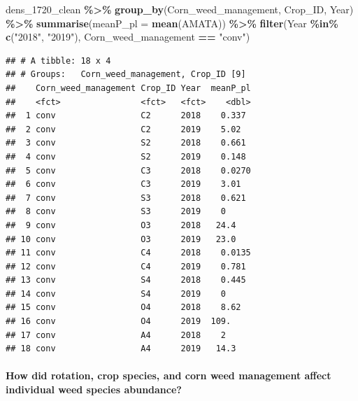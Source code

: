 \documentclass[
]{article}
\author{}
\date{\vspace{-2.5em}}
\newenvironment{Shaded}{\begin{snugshade}}{\end{snugshade}}
\newcommand{\AttributeTok}[1]{\textcolor[rgb]{0.13,0.29,0.53}{#1}}
\newcommand{\FunctionTok}[1]{\textcolor[rgb]{0.13,0.29,0.53}{\textbf{#1}}}
\newcommand{\NormalTok}[1]{#1}
\newcommand{\SpecialCharTok}[1]{\textcolor[rgb]{0.81,0.36,0.00}{\textbf{#1}}}
\newcommand{\StringTok}[1]{\textcolor[rgb]{0.31,0.60,0.02}{#1}}
\begin{document}
\begin{Shaded}
\begin{Highlighting}[]
\NormalTok{dens\_1720\_clean }\SpecialCharTok{\%\textgreater{}\%}
  \FunctionTok{group\_by}\NormalTok{(Corn\_weed\_management, Crop\_ID, Year) }\SpecialCharTok{\%\textgreater{}\%}
  \FunctionTok{summarise}\NormalTok{(}\AttributeTok{meanP\_pl =} \FunctionTok{mean}\NormalTok{(AMATA)) }\SpecialCharTok{\%\textgreater{}\%}
  \FunctionTok{filter}\NormalTok{(Year }\SpecialCharTok{\%in\%} \FunctionTok{c}\NormalTok{(}\StringTok{"2018"}\NormalTok{, }\StringTok{"2019"}\NormalTok{), Corn\_weed\_management }\SpecialCharTok{==} \StringTok{"conv"}\NormalTok{)}
\end{Highlighting}
\end{Shaded}

\begin{verbatim}
## # A tibble: 18 x 4
## # Groups:   Corn_weed_management, Crop_ID [9]
##    Corn_weed_management Crop_ID Year  meanP_pl
##    <fct>                <fct>   <fct>    <dbl>
##  1 conv                 C2      2018    0.337 
##  2 conv                 C2      2019    5.02  
##  3 conv                 S2      2018    0.661 
##  4 conv                 S2      2019    0.148 
##  5 conv                 C3      2018    0.0270
##  6 conv                 C3      2019    3.01  
##  7 conv                 S3      2018    0.621 
##  8 conv                 S3      2019    0     
##  9 conv                 O3      2018   24.4   
## 10 conv                 O3      2019   23.0   
## 11 conv                 C4      2018    0.0135
## 12 conv                 C4      2019    0.781 
## 13 conv                 S4      2018    0.445 
## 14 conv                 S4      2019    0     
## 15 conv                 O4      2018    8.62  
## 16 conv                 O4      2019  109.    
## 17 conv                 A4      2018    2     
## 18 conv                 A4      2019   14.3
\end{verbatim}

\paragraph*{How did rotation, crop species, and corn weed management affect individual weed species abundance?}\label{how-did-rotation-crop-species-and-corn-weed-management-affect-individual-weed-species-abundance}
\end{document}
